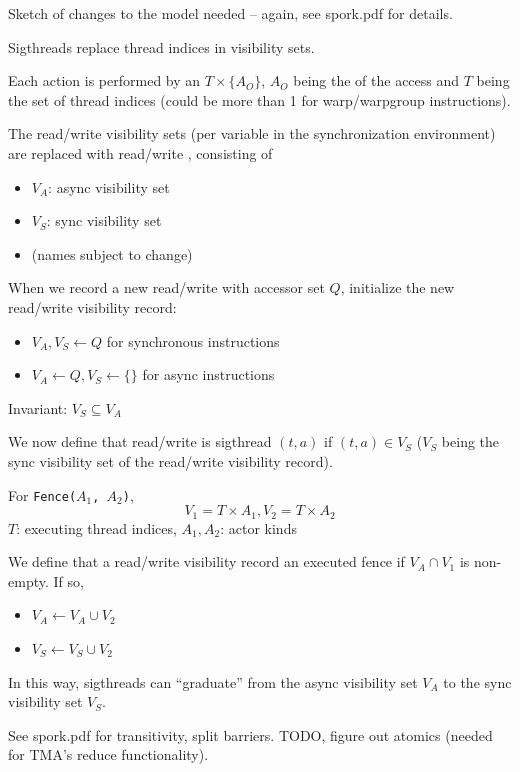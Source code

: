 \newpage
{}

Sketch of changes to the model needed -- again, see spork.pdf for details.

\begin{minipage}[t]{0.5\textwidth}\fixminipage


Sigthreads replace thread indices in visibility sets.

Each action is performed by an  $T \times \{A_O\}$,
$A_O$ being the  of the access and $T$ being the
set of thread indices (could be more than 1 for warp/warpgroup instructions).


The read/write visibility sets (per variable in the synchronization environment) are replaced with read/write , consisting of
\begin{itemize}
  \item $V_A$: async visibility set
  \item $V_S$: sync visibility set
  \item (names subject to change)
\end{itemize}
When we record a new read/write with accessor set $Q$, initialize the new read/write visibility record:
\begin{itemize}
  \item $V_A, V_S \leftarrow Q$ for synchronous instructions
  \item $V_A \leftarrow Q, V_S \leftarrow \{\}$ for async instructions
\end{itemize}
Invariant: $V_S \subseteq V_A$
\end{minipage}
\hfill
\begin{minipage}[t]{0.5\textwidth}\fixminipage
{}

We now define that read/write is  sigthread $(t, a)$ if $(t,a) \in V_S$ ($V_S$ being the sync visibility set of the read/write visibility record).


For \texttt{Fence($A_1$, $A_2$)},$$V_1 = T \times A_1, V_2 = T \times A_2$$
$T$: executing thread indices, $A_1,A_2$: actor kinds

We define that a read/write visibility record  an executed fence if $V_A \cap V_1$ is non-empty.
If so,
\begin{itemize}
  \item $V_A \leftarrow V_A \cup V_2$
  \item $V_S \leftarrow V_S \cup V_2$
\end{itemize}
In this way, sigthreads can ``graduate'' from the async visibility set $V_A$ to the sync visibility set $V_S$.

See spork.pdf for transitivity, split barriers.
TODO, figure out atomics (needed for TMA's reduce functionality).
\end{minipage}

